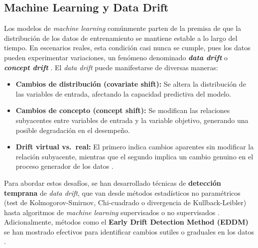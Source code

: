 \subsection{Machine Learning y Data Drift}
Los modelos de \textit{machine learning} comúnmente parten de la premisa de que la distribución de los datos de entrenamiento se mantiene estable a lo largo del tiempo. En escenarios reales, esta condición casi nunca se cumple, pues los datos pueden experimentar variaciones, un fenómeno denominado \textbf{\textit{data drift}} o \textbf{\textit{concept drift}} \citep{Lu2019, Gama2014, Zliobaite2016}. El \textit{data drift} puede manifestarse de diversas maneras:

\begin{itemize}
    \item \textbf{Cambios de distribución (covariate shift):} Se altera la distribución de las variables de entrada, afectando la capacidad predictiva del modelo.
    \item \textbf{Cambios de concepto (concept shift):} Se modifican las relaciones subyacentes entre variables de entrada y la variable objetivo, generando una posible degradación en el desempeño.
    \item \textbf{Drift virtual vs.\ real:} El primero indica cambios aparentes sin modificar la relación subyacente, mientras que el segundo implica un cambio genuino en el proceso generador de los datos \citep{Gama2014}.
\end{itemize}

Para abordar estos desafíos, se han desarrollado técnicas de \textbf{detección temprana} de \textit{data drift}, que van desde métodos estadísticos no paramétricos (test de Kolmogorov-Smirnov, Chi-cuadrado o divergencia de Kullback-Leibler) hasta algoritmos de \textit{machine learning} supervisados o no supervisados \citep{Chawla2021, Sethi2017}. Adicionalmente, métodos como el \textbf{Early Drift Detection Method (EDDM)} se han mostrado efectivos para identificar cambios sutiles o graduales en los datos \citep{BaenaGarcia2006}.

